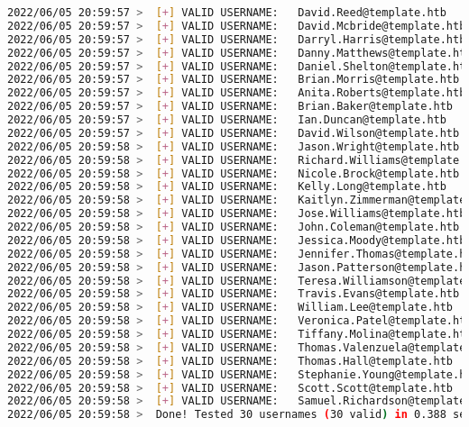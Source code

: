 \documentclass[a4paper]{article}
\begin{document}
\begin{lstlisting}[language=Bash, caption=kerbrute]
2022/06/05 20:59:57 >  [+] VALID USERNAME:	 David.Reed@template.htb
2022/06/05 20:59:57 >  [+] VALID USERNAME:	 David.Mcbride@template.htb
2022/06/05 20:59:57 >  [+] VALID USERNAME:	 Darryl.Harris@template.htb
2022/06/05 20:59:57 >  [+] VALID USERNAME:	 Danny.Matthews@template.htb
2022/06/05 20:59:57 >  [+] VALID USERNAME:	 Daniel.Shelton@template.htb
2022/06/05 20:59:57 >  [+] VALID USERNAME:	 Brian.Morris@template.htb
2022/06/05 20:59:57 >  [+] VALID USERNAME:	 Anita.Roberts@template.htb
2022/06/05 20:59:57 >  [+] VALID USERNAME:	 Brian.Baker@template.htb
2022/06/05 20:59:57 >  [+] VALID USERNAME:	 Ian.Duncan@template.htb
2022/06/05 20:59:57 >  [+] VALID USERNAME:	 David.Wilson@template.htb
2022/06/05 20:59:58 >  [+] VALID USERNAME:	 Jason.Wright@template.htb
2022/06/05 20:59:58 >  [+] VALID USERNAME:	 Richard.Williams@template.htb
2022/06/05 20:59:58 >  [+] VALID USERNAME:	 Nicole.Brock@template.htb
2022/06/05 20:59:58 >  [+] VALID USERNAME:	 Kelly.Long@template.htb
2022/06/05 20:59:58 >  [+] VALID USERNAME:	 Kaitlyn.Zimmerman@template.htb
2022/06/05 20:59:58 >  [+] VALID USERNAME:	 Jose.Williams@template.htb
2022/06/05 20:59:58 >  [+] VALID USERNAME:	 John.Coleman@template.htb
2022/06/05 20:59:58 >  [+] VALID USERNAME:	 Jessica.Moody@template.htb
2022/06/05 20:59:58 >  [+] VALID USERNAME:	 Jennifer.Thomas@template.htb
2022/06/05 20:59:58 >  [+] VALID USERNAME:	 Jason.Patterson@template.htb
2022/06/05 20:59:58 >  [+] VALID USERNAME:	 Teresa.Williamson@template.htb
2022/06/05 20:59:58 >  [+] VALID USERNAME:	 Travis.Evans@template.htb
2022/06/05 20:59:58 >  [+] VALID USERNAME:	 William.Lee@template.htb
2022/06/05 20:59:58 >  [+] VALID USERNAME:	 Veronica.Patel@template.htb
2022/06/05 20:59:58 >  [+] VALID USERNAME:	 Tiffany.Molina@template.htb
2022/06/05 20:59:58 >  [+] VALID USERNAME:	 Thomas.Valenzuela@template.htb
2022/06/05 20:59:58 >  [+] VALID USERNAME:	 Thomas.Hall@template.htb
2022/06/05 20:59:58 >  [+] VALID USERNAME:	 Stephanie.Young@template.htb
2022/06/05 20:59:58 >  [+] VALID USERNAME:	 Scott.Scott@template.htb
2022/06/05 20:59:58 >  [+] VALID USERNAME:	 Samuel.Richardson@template.htb
2022/06/05 20:59:58 >  Done! Tested 30 usernames (30 valid) in 0.388 seconds\end{lstlisting}
\end{document}
